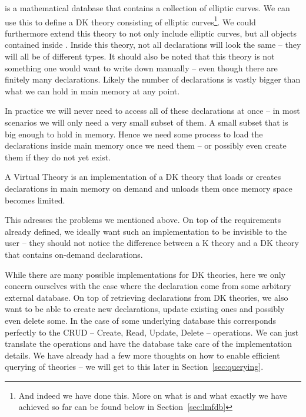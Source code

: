 \LMFDB is a mathematical database that contains a collection of elliptic curves. We can use
this to define a DK theory consisting of elliptic curves\footnote{And indeed we have done
  this. More on what \LMFDB is and what exactly we have achieved so far can be found below
  in Section~\ref{sec:lmfdb}}. We could furthermore extend this theory to not only include
elliptic curves, but all objects contained inside \LMFDB. Inside this theory, not all
declarations will look the same -- they will all be of different types. It should also be
noted that this theory is not something one would want to write down manually -- even
though there are finitely many declarations. Likely the number of declarations is vastly
bigger than what we can hold in main memory at any point.

In practice we will never need to access all of these declarations at once -- in most
scenarios we will only need a very small subset of them. A small subset that is big enough
to hold in memory. Hence we need some process to load the declarations inside main memory
once we need them -- or possibly even create them if they do not yet exist.

\begin{mydef}
  A Virtual Theory is an implementation of a DK theory that loads or creates declarations in main memory on demand and unloads them once memory space becomes limited.
\end{mydef}

This adresses the problems we mentioned above. On top of the requirements already defined,
we ideally want such an implementation to be invisible to the user -- they should not
notice the difference between a K theory and a DK theory that contains on-demand
declarations.

While there are many possible implementations for DK theories, here we only concern ourselves
with the case where the declaration come from some arbitary external database. On top of
retrieving declarations from DK theories, we also want to be able to create new declarations,
update existing ones and possibly even delete some. In the case of some underlying database
this corresponds perfectly to the CRUD -- Create, Read, Update, Delete -- operations. We can
just translate the operations and have the database take care of the implementation details. We
have already had a few more thoughts on how to enable efficient querying of theories -- we will
get to this later in Section~\ref{sec:querying}.

